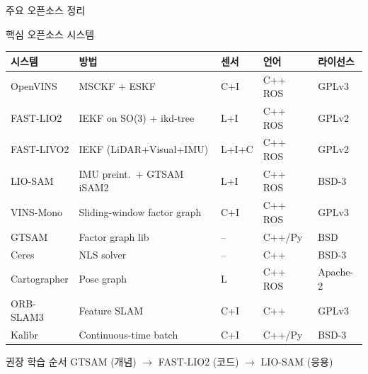 \begin{frame}[shrink=10]{주요 오픈소스 정리}
  \begin{block}{핵심 오픈소스 시스템}
    \begin{center}
      \begin{tabular}{lllll}
        \hline
        \textbf{시스템} & \textbf{방법} & \textbf{센서} & \textbf{언어} & \textbf{라이선스} \\
        \hline
        OpenVINS & MSCKF + ESKF & C+I & C++ ROS & GPLv3 \\
        FAST-LIO2 & IEKF on SO(3) + ikd-tree & L+I & C++ ROS & GPLv2 \\
        FAST-LIVO2 & IEKF (LiDAR+Visual+IMU) & L+I+C & C++ ROS & GPLv2 \\
        LIO-SAM & IMU preint.\ + GTSAM iSAM2 & L+I & C++ ROS & BSD-3 \\
        VINS-Mono & Sliding-window factor graph & C+I & C++ ROS & GPLv3 \\
        GTSAM & Factor graph lib & -- & C++/Py & BSD \\
        Ceres & NLS solver & -- & C++ & BSD-3 \\
        Cartographer & Pose graph & L & C++ ROS & Apache-2 \\
        ORB-SLAM3 & Feature SLAM & C+I & C++ & GPLv3 \\
        Kalibr & Continuous-time batch & C+I & C++/Py & BSD-3 \\
        \hline
      \end{tabular}
    \end{center}
  \end{block}
  \pause
  \begin{exampleblock}{권장 학습 순서}
    GTSAM (개념) $\to$ FAST-LIO2 (코드) $\to$ LIO-SAM (응용)
  \end{exampleblock}
\end{frame}

